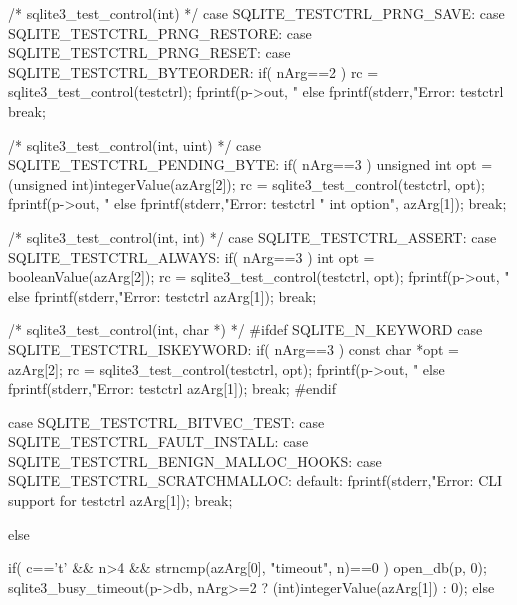 \begin{Codex}[label=shell.c,numbers=left]
{{{{        /* sqlite3_test_control(int) */
        case SQLITE_TESTCTRL_PRNG_SAVE:
        case SQLITE_TESTCTRL_PRNG_RESTORE:
        case SQLITE_TESTCTRL_PRNG_RESET:
        case SQLITE_TESTCTRL_BYTEORDER:
          if( nArg==2 ){
            rc = sqlite3_test_control(testctrl);
            fprintf(p->out, "%
          } else {
            fprintf(stderr,"Error: testctrl %
          }
          break;

        /* sqlite3_test_control(int, uint) */
        case SQLITE_TESTCTRL_PENDING_BYTE:        
          if( nArg==3 ){
            unsigned int opt = (unsigned int)integerValue(azArg[2]);
            rc = sqlite3_test_control(testctrl, opt);
            fprintf(p->out, "%
          } else {
            fprintf(stderr,"Error: testctrl %
                           " int option\n", azArg[1]);
          }
          break;
          
        /* sqlite3_test_control(int, int) */
        case SQLITE_TESTCTRL_ASSERT:              
        case SQLITE_TESTCTRL_ALWAYS:              
          if( nArg==3 ){
            int opt = booleanValue(azArg[2]);        
            rc = sqlite3_test_control(testctrl, opt);
            fprintf(p->out, "%
          } else {
            fprintf(stderr,"Error: testctrl %
                            azArg[1]);
          }
          break;

        /* sqlite3_test_control(int, char *) */
#ifdef SQLITE_N_KEYWORD
        case SQLITE_TESTCTRL_ISKEYWORD:           
          if( nArg==3 ){
            const char *opt = azArg[2];        
            rc = sqlite3_test_control(testctrl, opt);
            fprintf(p->out, "%
          } else {
            fprintf(stderr,"Error: testctrl %
                            azArg[1]);
          }
          break;
#endif

        case SQLITE_TESTCTRL_BITVEC_TEST:         
        case SQLITE_TESTCTRL_FAULT_INSTALL:       
        case SQLITE_TESTCTRL_BENIGN_MALLOC_HOOKS: 
        case SQLITE_TESTCTRL_SCRATCHMALLOC:       
        default:
          fprintf(stderr,"Error: CLI support for testctrl %
                  azArg[1]);
          break;
      }
    }
  }else

  if( c=='t' && n>4 && strncmp(azArg[0], "timeout", n)==0 ){
    open_db(p, 0);
    sqlite3_busy_timeout(p->db, nArg>=2 ? (int)integerValue(azArg[1]) : 0);
  }else
    
}
\end{Codex}
